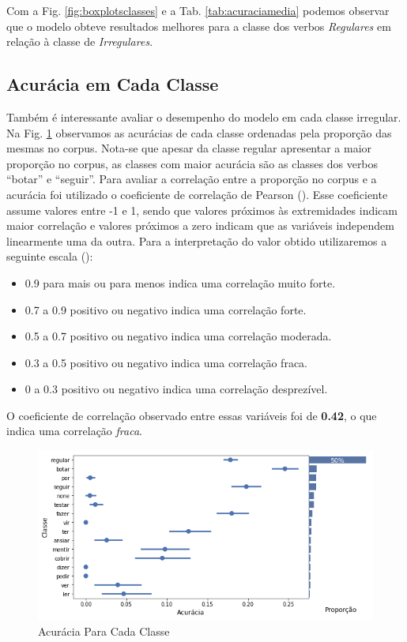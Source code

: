 Com a Fig. \ref{fig:boxplotsclasses} e a Tab. \ref{tab:acuraciamedia} podemos observar que o modelo obteve resultados melhores para a classe dos verbos \textit{Regulares} em relação à classe de \textit{Irregulares}. 


\subsection{Acurácia em Cada Classe}
\label{sec:prop}

Também é interessante avaliar o desempenho do modelo em cada classe irregular. Na Fig. \ref{fig:kfoldprop} observamos as acurácias de cada classe ordenadas pela proporção das mesmas no corpus. Nota-se que apesar da classe regular apresentar a maior proporção no corpus, as classes com maior acurácia são as classes dos verbos “botar” e “seguir”. Para avaliar a correlação entre a proporção no corpus e a acurácia foi utilizado o coeficiente de correlação de Pearson (\cite{2004:bussab}). Esse coeficiente assume valores entre -1 e 1, sendo que valores próximos às extremidades indicam maior correlação e valores próximos a zero indicam que as variáveis independem linearmente uma da outra. Para a interpretação do valor obtido utilizaremos a seguinte escala (\cite{pearson:1989}):

\begin{itemize}
    \item 0.9 para mais ou para menos indica uma correlação muito forte.
    \item0.7 a 0.9 positivo ou negativo indica uma correlação forte.
    \item0.5 a 0.7 positivo ou negativo indica uma correlação moderada.
    \item0.3 a 0.5 positivo ou negativo indica uma correlação fraca.
    \item0 a 0.3 positivo ou negativo indica uma correlação desprezível.
\end{itemize}

O coeficiente de correlação observado entre essas variáveis foi de \textbf{0.42}, o que indica uma correlação \textit{fraca}. 

\begin{figure}[H]
  \centering
  \includegraphics[width=0.8\linewidth]{img/proporxacc.png}
  \caption{Acurácia Para Cada Classe}
  \label{fig:kfoldprop}
\end{figure}


